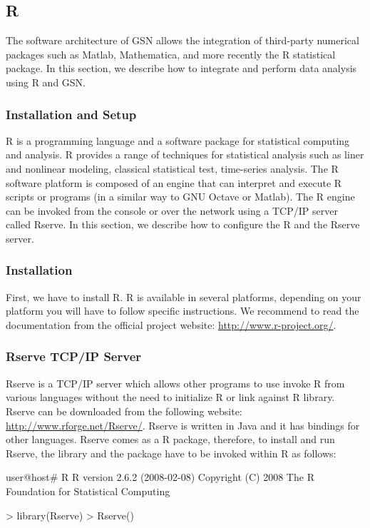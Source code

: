\subsection{R \vs \label{r:vsp}}
The software architecture of GSN allows the integration of third-party numerical packages such as Matlab, Mathematica, and more recently the R statistical package. In this section, we describe how to integrate and perform data analysis using R and GSN. 

\subsubsection{Installation and Setup}
R is a programming language and a software package for statistical computing and analysis. R provides a range of techniques for statistical analysis such as liner and nonlinear modeling, classical statistical test, time-series analysis. The R software platform is composed of an engine that can interpret and execute R scripts or programs (in a similar way to GNU Octave or Matlab). The R engine can be invoked from the console or over the network using a TCP/IP server called Rserve. In this section, we describe how to configure the R and the Rserve server.

\subsubsection*{Installation}
First, we have to install R. R is available in several platforms, depending on your platform you will have to follow specific instructions. We recommend to read the documentation from the official project website: \url{http://www.r-project.org/}. 

\subsubsection*{Rserve TCP/IP Server}
Rserve is a TCP/IP server which allows other programs to use invoke R from various languages without the need to initialize R or link against R library. Rserve can be downloaded from the following website: \url{http://www.rforge.net/Rserve/}. Rserve is written in Java and it has bindings for other languages.
Rserve comes as a R package, therefore, to install and run Rserve, the library and the package have to be invoked within R as follows:

\begin{bashcode}[caption={Running R and starting Rserve server.}, label=listing:bash:r_vsd]
user@host\# R
R version 2.6.2 (2008-02-08) 
Copyright (C) 2008 The R Foundation for Statistical Computing 

> library(Rserve) 
> Rserve()
\end{bashcode}

